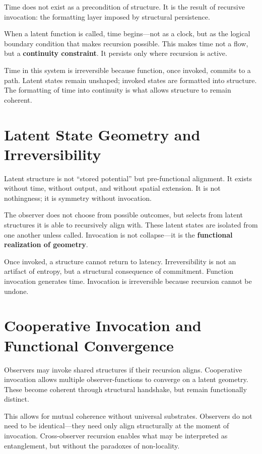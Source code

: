 \documentclass[12pt]{article}
\begin{document}
Time does not exist as a precondition of structure. It is the result of recursive invocation: the formatting layer imposed by structural persistence.

When a latent function is called, time begins---not as a clock, but as the logical boundary condition that makes recursion possible. This makes time not a flow, but a \textbf{continuity constraint}. It persists only where recursion is active.

Time in this system is irreversible because function, once invoked, commits to a path. Latent states remain unshaped; invoked states are formatted into structure. The formatting of time into continuity is what allows structure to remain coherent.

\section{Latent State Geometry and Irreversibility}

Latent structure is not ``stored potential'' but pre-functional alignment. It exists without time, without output, and without spatial extension. It is not nothingness; it is symmetry without invocation.

The observer does not choose from possible outcomes, but selects from latent structures it is able to recursively align with. These latent states are isolated from one another unless called. Invocation is not collapse---it is the \textbf{functional realization of geometry}.

Once invoked, a structure cannot return to latency. Irreversibility is not an artifact of entropy, but a structural consequence of commitment. Function invocation generates time. Invocation is irreversible because recursion cannot be undone.

\section{Cooperative Invocation and Functional Convergence}

Observers may invoke shared structures if their recursion aligns. Cooperative invocation allows multiple observer-functions to converge on a latent geometry. These become coherent through structural handshake, but remain functionally distinct.

This allows for mutual coherence without universal substrates. Observers do not need to be identical---they need only align structurally at the moment of invocation. Cross-observer recursion enables what may be interpreted as entanglement, but without the paradoxes of non-locality.
\end{document}

